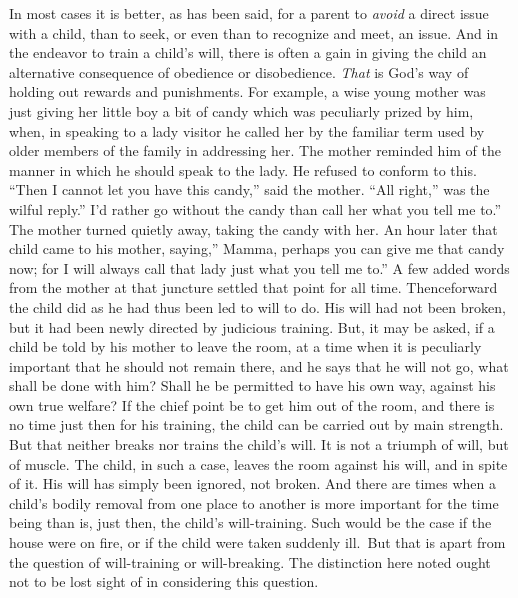 \documentclass[
]{book}
\begin{document}
In most cases it is better, as has been said, for a parent to \emph{avoid} a direct issue with a child, than to seek, or even than to recognize and meet, an issue. And in the endeavor to train a child's will, there is often a gain in giving the child an alternative consequence of obedience or disobedience. \emph{That} is God's way of holding out rewards and punishments. For example, a wise young mother was just giving her little boy a bit of candy which was peculiarly prized by him, when, in speaking to a lady visitor he called her by the familiar term used by older members of the family in addressing her. The mother reminded him of the manner in which he should speak to the lady. He refused to conform to this. ``Then I cannot let you have this candy,'' said the mother. ``All right,'' was the wilful reply.'' I'd rather go without the candy than call her what you tell me to.'' The mother turned quietly away, taking the candy with her. An hour later that child came to his mother, saying,'' Mamma, perhaps you can give me that candy now; for I will always call that lady just what you tell me to.'' A few added words from the mother at that juncture settled that point for all time. Thenceforward the child did as he had thus been led to will to do. His will had not been broken, but it had been newly directed by judicious training. But, it may be asked, if a child be told by his mother to leave the room, at a time when it is peculiarly important that he should not remain there, and he says that he will not go, what shall be done with him? Shall he be permitted to have his own way, against his own true welfare? If the chief point be to get him out of the room, and there is no time just then for his training, the child can be carried out by main strength. But that neither breaks nor trains the child's will. It is not a triumph of will, but of muscle. The child, in such a case, leaves the room against his will, and in spite of it. His will has simply been ignored, not broken. And there are times when a child's bodily removal from one place to another is more important for the time being than is, just then, the child's will-training. Such would be the case if the house were on fire, or if the child were taken suddenly ill.~But that is apart from the question of will-training or will-breaking. The distinction here noted ought not to be lost sight of in considering this question.
\end{document}
